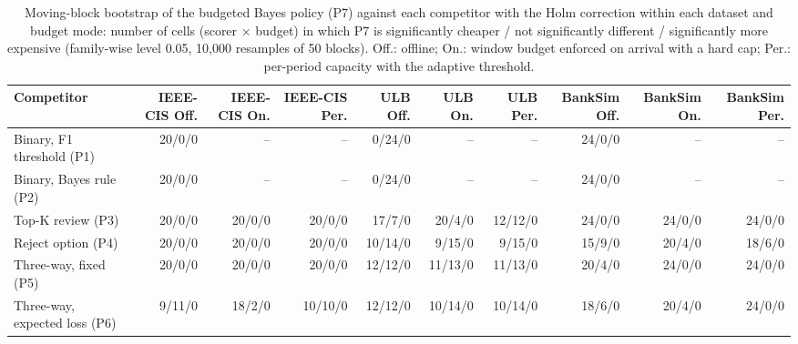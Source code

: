 \begin{table}[t]
\centering
\caption{Moving-block bootstrap of the budgeted Bayes policy (P7) against each competitor with the Holm correction within each dataset and budget mode: number of cells (scorer $\times$ budget) in which P7 is significantly cheaper / not significantly different / significantly more expensive (family-wise level 0.05, 10,000 resamples of 50 blocks). Off.: offline; On.: window budget enforced on arrival with a hard cap; Per.: per-period capacity with the adaptive threshold.}
\label{tab:boot}
\begin{tabular}{lrrrrrrrrr}
\toprule
Competitor & IEEE-CIS Off. & IEEE-CIS On. & IEEE-CIS Per. & ULB Off. & ULB On. & ULB Per. & BankSim Off. & BankSim On. & BankSim Per. \\
\midrule
Binary, F1 threshold (P1) & 20/0/0 & -- & -- & 0/24/0 & -- & -- & 24/0/0 & -- & -- \\
Binary, Bayes rule (P2) & 20/0/0 & -- & -- & 0/24/0 & -- & -- & 24/0/0 & -- & -- \\
Top-K review (P3) & 20/0/0 & 20/0/0 & 20/0/0 & 17/7/0 & 20/4/0 & 12/12/0 & 24/0/0 & 24/0/0 & 24/0/0 \\
Reject option (P4) & 20/0/0 & 20/0/0 & 20/0/0 & 10/14/0 & 9/15/0 & 9/15/0 & 15/9/0 & 20/4/0 & 18/6/0 \\
Three-way, fixed (P5) & 20/0/0 & 20/0/0 & 20/0/0 & 12/12/0 & 11/13/0 & 11/13/0 & 20/4/0 & 24/0/0 & 24/0/0 \\
Three-way, expected loss (P6) & 9/11/0 & 18/2/0 & 10/10/0 & 12/12/0 & 10/14/0 & 10/14/0 & 18/6/0 & 20/4/0 & 24/0/0 \\
\bottomrule
\end{tabular}
\end{table}
